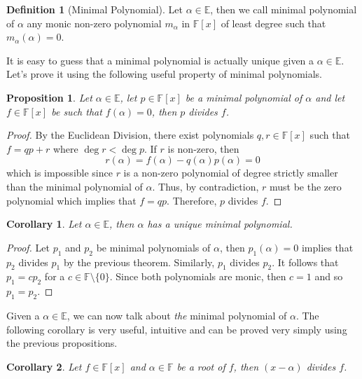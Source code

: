 \documentclass{article}
\theoremstyle{plain}
\newtheorem{proposition}[theorem]{Proposition}
\newtheorem*{corollary}{Corollary}
\theoremstyle{definition}
\newtheorem*{definition}{Definition}
\newcommand{\F}{\mathbb{F}}
\newcommand{\E}{\mathbb{E}}
\begin{document}
\begin{definition}[Minimal Polynomial]
    Let $\alpha \in \E$, then we call minimal polynomial of $\alpha$ any monic non-zero polynomial $m_{\alpha}$ in $\F[x]$ of least degree such that $m_{\alpha}(\alpha) = 0$.
\end{definition}

It is easy to guess that a minimal polynomial is actually unique given a $\alpha \in \E$. Let's prove it using the following useful property of minimal polynomials.

\begin{proposition}
    Let $\alpha \in \E$, let $p \in \F[x]$ be a minimal polynomial of $\alpha$ and let $f \in \F[x]$ be such that $f(\alpha) = 0$, then $p$ divides $f$.
\end{proposition}

\begin{proof}
    By the Euclidean Division, there exist polynomials $q,r \in \F[x]$ such that $f = qp + r$ where $\deg r < \deg p$. If $r$ is non-zero, then 
    $$r(\alpha) = f(\alpha) - q(\alpha)p(\alpha) = 0$$
    which is impossible since $r$ is a non-zero polynomial of degree strictly smaller than the minimal polynomial of $\alpha$. Thus, by contradiction, $r$ must be the zero polynomial which implies that $f = qp$. Therefore, $p$ divides $f$.
\end{proof}

\begin{corollary}
    Let $\alpha \in \E$, then $\alpha$ has a unique minimal polynomial.
\end{corollary}

\begin{proof}
    Let $p_1$ and $p_2$ be minimal polynomials of $\alpha$, then $p_1(\alpha) = 0$ implies that $p_2$ divides $p_1$ by the previous theorem. Similarly, $p_1$ divides $p_2$. It follows that $p_1 = c p_2$ for a $c \in \F \setminus \{0\}$. Since both polynomials are monic, then $c = 1$ and so $p_1 = p_2$. 
\end{proof}

Given a $\alpha \in \E$, we can now talk about \textit{the} minimal polynomial of $\alpha$. The following corollary is very useful, intuitive and can be proved very simply using the previous propositions.

\begin{corollary}
    Let $f \in \F[x]$ and $\alpha \in \F$ be a root of $f$, then $(x - \alpha)$ divides $f$.
\end{corollary}
\end{document}
